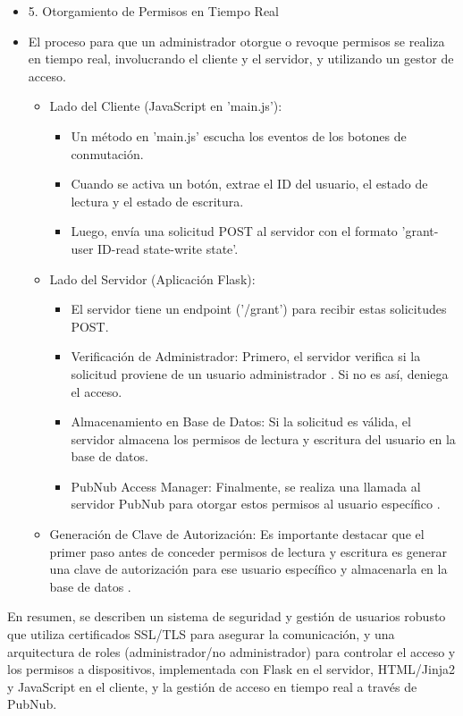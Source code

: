 \documentclass{report}
\begin{document}
\begin{itemize}
    \item 5. Otorgamiento de Permisos en Tiempo Real
    \item El proceso para que un administrador otorgue o revoque permisos se realiza en tiempo real, involucrando el cliente y el servidor, y utilizando 
    un gestor de acceso.
    \begin{itemize}
        \item  Lado del Cliente (JavaScript en 'main.js'):
        \begin{itemize}
            \item Un método en 'main.js' escucha los eventos de los botones de conmutación.
            \item Cuando se activa un botón, extrae el ID del usuario, el estado de lectura y el estado de escritura.
            \item Luego, envía una  solicitud POST  al servidor con el formato 'grant-user ID-read state-write state'.
        \end{itemize}
        
        \item  Lado del Servidor (Aplicación Flask):
        \begin{itemize}
            \item El servidor tiene un endpoint ('/grant') para recibir estas solicitudes POST.
            \item Verificación de Administrador: Primero, el servidor  verifica si la solicitud proviene de un usuario administrador . Si no es así, 
            deniega el acceso.
            \item Almacenamiento en Base de Datos: Si la solicitud es válida, el servidor  almacena los permisos de lectura y escritura del usuario 
            en la base de datos.
            \item PubNub Access Manager: Finalmente, se realiza una llamada al  servidor PubNub para otorgar estos permisos al usuario específico .
        \end{itemize}

        \item  Generación de Clave de Autorización: Es importante destacar que el primer paso antes de conceder permisos de lectura y escritura 
        es  generar una clave de autorización para ese usuario específico y almacenarla en la base de datos .    
    \end{itemize}
\end{itemize}
En resumen, se  describen un sistema de seguridad y gestión de usuarios robusto que utiliza certificados SSL/TLS para asegurar la 
comunicación, y una arquitectura de roles (administrador/no administrador) para controlar el acceso y los permisos a dispositivos, 
implementada con Flask en el servidor, HTML/Jinja2 y JavaScript en el cliente, y la gestión de acceso en tiempo real a través de PubNub.
\end{document}
